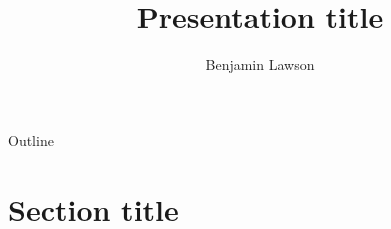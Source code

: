 \documentclass[xcolor=dvipsnames]{beamer}
\title{Presentation title}
\author{Benjamin Lawson}
\begin{document}
\begin{frame}
    \titlepage
\end{frame}

\begin{frame}{Outline}
    \tableofcontents
\end{frame}

\section{Section title}




\end{document}
